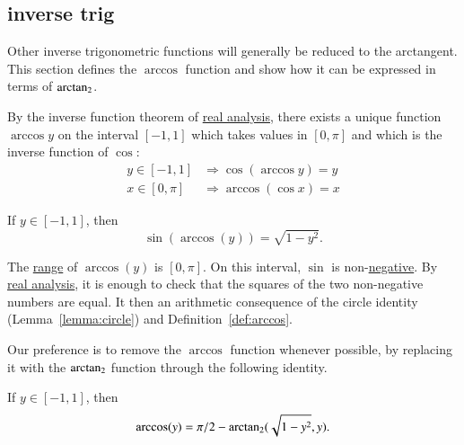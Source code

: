 \subsection{inverse trig}
%
Other inverse trigonometric functions will generally be reduced to
the arctangent.  This section defines the $\arccos$ function and show how it can be expressed in terms of ${\operatorname{arctan_2}}$.

\begin{definition}[arccos]\label{def:arccos}
By the inverse function theorem of \hyperref[back:analysis]{real analysis}, there exists a unique function
$\arccos y$ on the interval $[-1,1]$ which takes
values in $[0,\pi]$ and which is the inverse function of $\cos$:
    $$\begin{array}{lll}
        y\in [-1,1] &\Rightarrow \cos(\arccos y) = y\\
        x\in[0,\pi] &\Rightarrow \arccos(\cos x) = x
    \end{array}$$
%
%
\end{definition}

\begin{lemma}\label{lemma:sin-arccos} 
If $y\in[-1,1]$, then
    $$\sin(\arccos(y)) = \sqrt{1-y^2}.$$
\end{lemma}

\begin{proved}
    The \hyperref[def:arccos]{range} of $\arccos(y)$ is $[0,\pi]$.  
   On this interval, $\sin$
    is non-\hyperref[lemma:sin-pos]{negative}.  By \hyperref[back:analysis]{real analysis}, it is enough to check that the squares of the two non-negative numbers are equal.  It then an arithmetic consequence of the circle identity
    (Lemma~\ref{lemma:circle}) and Definition~\ref{def:arccos}.
\swallowed\end{proved}


Our preference is to remove the $\arccos$ function whenever
possible, by replacing it with the ${\operatorname{arctan_2}}$ function through the
following identity.  


\begin{lemma}\label{lemma:arccos-arctan}  
If $y\in [-1,1]$, then
    $$\arccos(y) = \pi/2 - {\operatorname{arctan_2}}({ \sqrt{1-y^2}},{y}).$$
\end{lemma}
%
%
%
%

